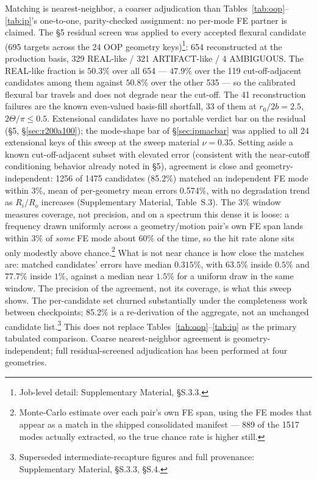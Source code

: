 \documentclass[11pt]{article}
\begin{document}
Matching is nearest-neighbor, a coarser adjudication than
Tables~\ref{tab:oop}--\ref{tab:ip}'s one-to-one, parity-checked
assignment: no per-mode FE partner is claimed. The \S5 residual screen
was applied to every accepted flexural candidate (695 targets across
the 24 OOP geometry keys)\footnote{Job-level detail: Supplementary
Material, §S.3.3.}: 654 reconstructed
at the production basis, 329 REAL-like / 321 ARTIFACT-like /
4 AMBIGUOUS. The REAL-like fraction is $50.3\%$ over all 654 --- $47.9\%$
over the 119 cut-off-adjacent candidates among them against $50.8\%$ over
the other 535 --- so the calibrated flexural bar travels and does not
degrade near the cut-off.
The 41 reconstruction failures are the known even-valued
basis-fill shortfall, 33 of them at
$r_0/2b=2.5$, $2\Theta/\pi\le0.5$. Extensional candidates have no
portable verdict bar on the residual
(\S5, \S\ref{sec:r200a100}); the mode-shape bar of \S\ref{sec:ipmacbar}
was applied to all 24 extensional keys of this sweep at the sweep
material $\nu=0.35$. Setting aside a known cut-off-adjacent subset
with elevated error (consistent with the near-cutoff conditioning
behavior already noted in \S5), agreement is close and
geometry-independent: 1256 of 1475 candidates (85.2\%) matched an
independent FE mode within 3\%, mean of per-geometry mean errors 0.574\%,
with no degradation trend as $R_i/R_o$ increases (Supplementary Material,
Table~S.3). The $3\%$ window measures coverage, not precision, and on a
spectrum this dense it is loose: a frequency drawn uniformly across a
geometry/motion pair's own FE span lands within $3\%$ of \emph{some} FE
mode about $60\%$ of the time, so the hit rate alone sits only modestly
above chance.\footnote{Monte-Carlo estimate over each pair's own FE span,
using the FE modes that appear as a match in the shipped consolidated
manifest --- 889 of the 1517 modes actually extracted, so the true chance
rate is higher still.} What is not near chance is how close the matches
are: matched candidates' errors have median $0.315\%$, with $63.5\%$ inside
$0.5\%$ and $77.7\%$ inside $1\%$, against a median near $1.5\%$ for a
uniform draw in the same window. The precision of the agreement, not its
coverage, is what this sweep shows. The per-candidate set churned substantially under the
completeness work between checkpoints; 85.2\% is a re-derivation of the
aggregate, not an unchanged candidate list.\footnote{Superseded intermediate-recapture figures and full provenance: Supplementary Material, §S.3.3, §S.4.} This does not
replace Tables~\ref{tab:oop}--\ref{tab:ip} as the primary tabulated
comparison.
Coarse nearest-neighbor agreement is geometry-independent; full
residual-screened adjudication has been performed at four geometries.
\end{document}
